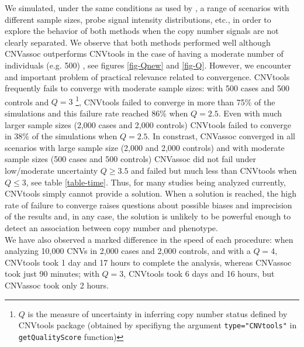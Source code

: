 \documentclass[11pt]{article}
\begin{document}
We simulated, under the same conditions as used by \cite{CNVtools}, a range of scenarios with different sample sizes, probe signal intensity 
distributions, etc., in order to explore the behavior of both methods when the copy number signals are not clearly separated. We observe
that both methods performed well although CNVassoc outperforms CNVtools in the case of having a moderate number of individuals (e.g. 500)
, see figures \ref{fig-Qnew} and \ref{fig-Q}. However, we encounter and important problem of practical relevance related to convergence. 
CNVtools frequently fails to converge with moderate sample sizes: with 500 cases and 500 controls and $Q=3$ \footnote{$Q$ is the measure 
of uncertainty in inferring copy number status defined by CNVtools package (obtained by specifiyng the argument \texttt{type="CNVtools"} 
in \texttt{getQualityScore} function)}, CNVtools failed to converge in more than 75\% of the simulations and this 
failure rate reached 86\% when $Q=2.5$. Even with much larger sample sizes (2,000 cases and 2,000 controls) CNVtools failed to converge in 
38\% of the simulations when $Q=2.5$. In constrast, CNVassoc converged in all scenarios with large sample size (2,000 and 2,000 controls)
and with moderate sample sizes (500 cases and 500 controls) CNVassoc did not fail under low/moderate uncertainty $Q \geq 3.5$ and failed 
but much less than CNVtools when $Q \leq 3$, see table \ref{table-time}. Thus, for many studies being analyzed currently, 
CNVtools simply cannot provide a solution. When a solution is reached, the high rate of failure to converge raises questions about
possible biases and imprecision of the results and, in any case, the solution is unlikely to be powerful enough to detect an association
between copy number and phenotype.\\

We have also observed a marked difference in the speed of each procedure: when analyzing 10,000 CNVs in 2,000 cases and 2,000 controls,
and with a $Q=4$, CNVtools took 1 day and 17 hours to complete the analysis, whereas CNVassoc took just 90 minutes; with $Q=3$, CNVtools took 
6 days and 16 hours, but CNVassoc took only 2 hours.\\
\end{document}
